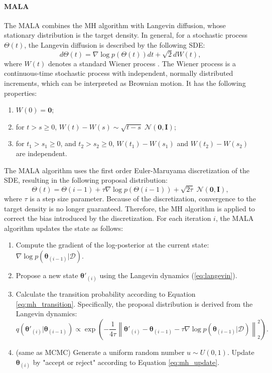 \paragraph{\acf{MALA}}
The \ac{MALA} \citep{besag2004markov} combines the \ac{MH} algorithm with Langevin diffusion, whose stationary distribution is the target density. In general, for a stochastic process $\Theta(t)$, the Langevin diffusion is described by the following \ac{SDE}:
\begin{equation}
d\Theta(t)=\nabla \log p(\Theta(t))dt + \sqrt{2} dW(t),
\end{equation}
where $W(t)$ denotes a standard Wiener process \citep{gabbiani2010mathematics}. The Wiener process is a continuous-time stochastic process with independent, normally distributed increments, which can be interpreted as Brownian motion. It has the following properties:
\begin{enumerate}
    \item [(1)] $W(0)=\boldsymbol{0}$;
    \item [(2)] for $t > s \geq 0 $, $W(t)-W(s)\sim\sqrt{t-s}\;\mathcal{N}(\boldsymbol{0}, \boldsymbol{I})$;
    \item [(3)] for $t_1>s_1\geq 0$, and $t_2>s_2\geq 0$, $W(t_1)-W(s_1)$ and $W(t_2)-W(s_2)$ are independent. 
\end{enumerate}                 
The \ac{MALA} algorithm uses the first order Euler-Maruyama discretization of the \ac{SDE}, resulting in the following proposal distribution:
\begin{equation}
    \label{eq:langevin}
    \Theta(t) = \Theta(i-1) + \tau \nabla \log p(\Theta(i-1)) + \sqrt{2\tau}\; \mathcal{N}(\boldsymbol{0}, \boldsymbol{I}),
\end{equation}
where $\tau$ is a step size parameter.
Because of the discretization, convergence to the target density is no longer guaranteed. Therefore, the \ac{MH} algorithm is applied to correct the bias introduced by the discretization. 
For each iteration $i$, the \ac{MALA} algorithm updates the state as follows:
\begin{enumerate}
    \item[(a)] Compute the gradient of the log-posterior at the current state: $\nabla \log p(\boldsymbol{\theta}_{(i-1)}|\mathcal{D})$.
    \item[(b)] Propose a new state $\boldsymbol{\theta}'_{(i)}$ using the Langevin dynamics (\ref{eq:langevin}).
    \item[(c)] Calculate the transition probability according to Equation \ref{eq:mh_transition}. Specifically, the proposal distribution is derived from the Langevin dynamics:
    \begin{equation}
        q(\boldsymbol{\theta}'_{(i)}|\boldsymbol{\theta}_{(i-1)})\propto \exp(-\frac{1}{4\tau}\left\|\boldsymbol{\theta}'_{(i)}-\boldsymbol{\theta}_{(i-1)}-\tau\nabla\log p(\boldsymbol{\theta}_{(i-1)}|\mathcal{D})\right\|^2_2).
    \end{equation}
    \item[(d)] (same as MCMC) Generate a uniform random number $u \sim U(0,1)$. Update $\boldsymbol{\theta}_{(i)}$ by "accept or reject" according to Equation \ref{eq:mh_update}. 
\end{enumerate}

